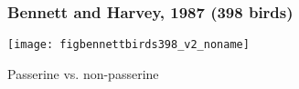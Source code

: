 \begin{frame}


\end{frame}

\begin{frame}
  \frametitle{Bennett and Harvey, 1987 (398 birds)}

  \begin{center}
    \texttt{[image: figbennettbirds398\_v2\_noname]}
  \end{center}

  Passerine vs. non-passerine

\end{frame}

